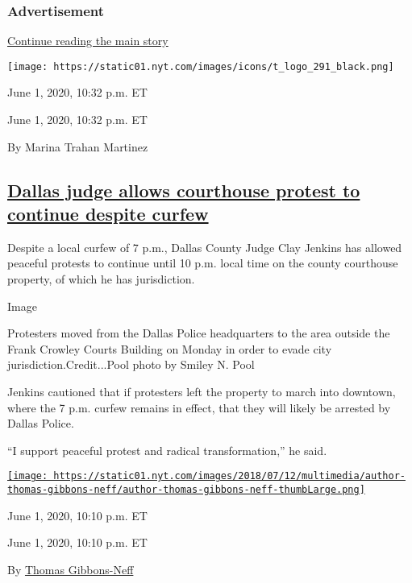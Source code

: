 \hypertarget{advertisement-4}{%
\subsubsection{Advertisement}\label{advertisement-4}}

\protect\hyperlink{after-dfp-ad-mid5}{Continue reading the main story}

\texttt{[image: https://static01.nyt.com/images/icons/t\_logo\_291\_black.png]}

June 1, 2020, 10:32 p.m. ET

June 1, 2020, 10:32 p.m. ET

By Marina Trahan Martinez

\hypertarget{dallas-judge-allows-courthouse-protest-to-continue-despite-curfew}{%
\subsection{\texorpdfstring{\protect\hyperlink{dallas-judge-allows-courthouse-protest-to-continue-despite-curfew}{Dallas
judge allows courthouse protest to continue despite
curfew}}{Dallas judge allows courthouse protest to continue despite curfew}}\label{dallas-judge-allows-courthouse-protest-to-continue-despite-curfew}}

Despite a local curfew of 7 p.m., Dallas County Judge Clay Jenkins has
allowed peaceful protests to continue until 10 p.m. local time on the
county courthouse property, of which he has jurisdiction.

Image

Protesters moved from the Dallas Police headquarters to the area outside
the Frank Crowley Courts Building on Monday in order to evade city
jurisdiction.Credit...Pool photo by Smiley N. Pool

Jenkins cautioned that if protesters left the property to march into
downtown, where the 7 p.m. curfew remains in effect, that they will
likely be arrested by Dallas Police.

``I support peaceful protest and radical transformation,'' he said.

\href{https://www.nytimes.com/by/thomas-gibbons-neff}{\texttt{[image: https://static01.nyt.com/images/2018/07/12/multimedia/author-thomas-gibbons-neff/author-thomas-gibbons-neff-thumbLarge.png]}}

June 1, 2020, 10:10 p.m. ET

June 1, 2020, 10:10 p.m. ET

By \href{https://www.nytimes.com/by/thomas-gibbons-neff}{Thomas
Gibbons-Neff}

